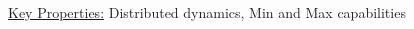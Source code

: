 \documentclass[	hyperref={pdfpagelabels=false}, xcolor=dvipsnames,
		11pt]{beamer}
\begin{document}
\begin{frame}
\begin{columns}
\begin{column}{5cm}
\begin{overprint}
{\begin{minipage}[t]{5 cm}
\begin{figure}[h]
\begin{center}
		\end{center}
	\end{figure}
	\end{minipage} }

	\end{overprint}
	\end{column}
	\end{columns}

	\begin{alertblock}{\underline{Key Properties:}}
		Distributed dynamics, Min and Max capabilities
	\end{alertblock}
\end{frame}
\end{document}
